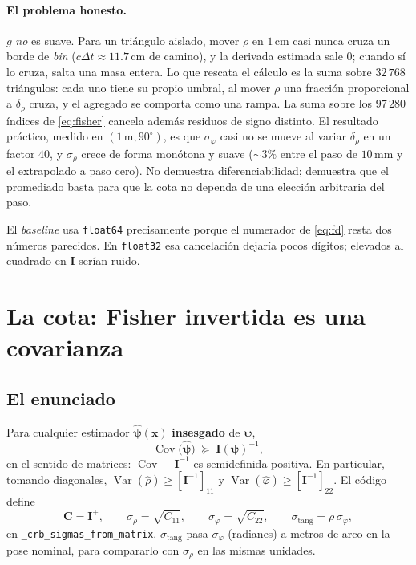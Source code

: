 \documentclass[11pt,a4paper]{article}
\newcommand{\vect}[1]{\boldsymbol{#1}}
\newcommand{\matr}[1]{\mathbf{#1}}
\newcommand{\code}[1]{\texttt{#1}}
\DeclareMathOperator{\Cov}{Cov}
\theoremstyle{definition}
\theoremstyle{plain}
\begin{document}
\paragraph{El problema honesto.}
$g$ \emph{no} es suave. Para un tri\'angulo aislado, mover $\rho$ en
$1\,\mathrm{cm}$ casi nunca cruza un borde de \emph{bin} ($c\Delta t\approx
11.7\,\mathrm{cm}$ de camino), y la derivada estimada sale $0$; cuando s\'i lo
cruza, salta una masa entera. Lo que rescata el c\'alculo es la suma sobre
$32\,768$ tri\'angulos: cada uno tiene su propio umbral, al mover $\rho$ una
fracci\'on proporcional a $\delta_\rho$ cruza, y el agregado se comporta como
una rampa. La suma sobre los $97\,280$ \'indices de \eqref{eq:fisher} cancela
adem\'as residuos de signo distinto. El resultado pr\'actico, medido en
$(1\,\mathrm{m},90^\circ)$, es que $\sigma_\varphi$ casi no se mueve al variar
$\delta_\rho$ en un factor $40$, y $\sigma_\rho$ crece de forma mon\'otona y
suave ($\sim 3\%$ entre el paso de $10\,\mathrm{mm}$ y el extrapolado a paso
cero). No demuestra diferenciabilidad; demuestra que el promediado basta para
que la cota no dependa de una elecci\'on arbitraria del paso.

El \emph{baseline} usa \code{float64} precisamente porque el numerador de
\eqref{eq:fd} resta dos n\'umeros parecidos. En \code{float32} esa cancelaci\'on
dejar\'ia pocos d\'igitos; elevados al cuadrado en $\matr I$ ser\'ian ruido.

\section{La cota: Fisher invertida es una covarianza}
\label{sec:crb}

\subsection{El enunciado}

Para cualquier estimador $\hat{\vect\psi}(\vect x)$ \textbf{insesgado} de
$\vect\psi$,
%
\begin{equation}
\label{eq:crb}
\Cov\bigl(\hat{\vect\psi}\bigr) \;\succeq\; \matr I(\vect\psi)^{-1},
\end{equation}
%
en el sentido de matrices: $\Cov-\matr I^{-1}$ es semidefinida positiva. En
particular, tomando diagonales,
$\operatorname{Var}(\hat\rho)\ge [\matr I^{-1}]_{11}$ y
$\operatorname{Var}(\hat\varphi)\ge [\matr I^{-1}]_{22}$. El c\'odigo define
%
\begin{equation}
\label{eq:C}
\matr C = \matr I^{+},
\qquad
\sigma_\rho=\sqrt{C_{11}},
\qquad
\sigma_\varphi=\sqrt{C_{22}},
\qquad
\sigma_{\mathrm{tang}}=\rho\,\sigma_\varphi,
\end{equation}
%
en \code{\_crb\_sigmas\_from\_matrix}. $\sigma_{\mathrm{tang}}$ pasa
$\sigma_\varphi$ (radianes) a metros de arco en la pose nominal, para
compararlo con $\sigma_\rho$ en las mismas unidades.
\end{document}
